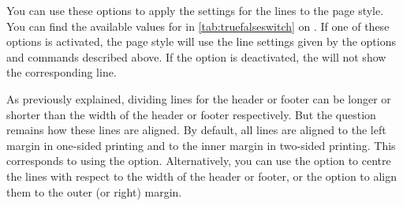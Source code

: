\begin{Declaration}
\end{Declaration}
You can use these options to apply the settings for the lines to the
 page style. You can find the available values for
 in \autoref{tab:truefalseswitch} on
. If one of these options is activated, the
 page style will use the line settings given by the options
and commands described above. If the option is deactivated, the
 will not show the corresponding line.%
\EndIndexGroup


\begin{Declaration}
\end{Declaration}
As previously explained, dividing lines for the header or footer can be longer
or shorter than the width of the header or footer respectively. But the
question remains how these lines are aligned. By default, all lines are
aligned to the left margin in one-sided printing and to the inner margin in
two-sided printing. This corresponds to using the  option.
Alternatively, you can use the  option to centre the lines with
respect to the width of the header or footer, or the  option to
align them to the outer (or right) margin.%
\EndIndexGroup
%
\EndIndexGroup

